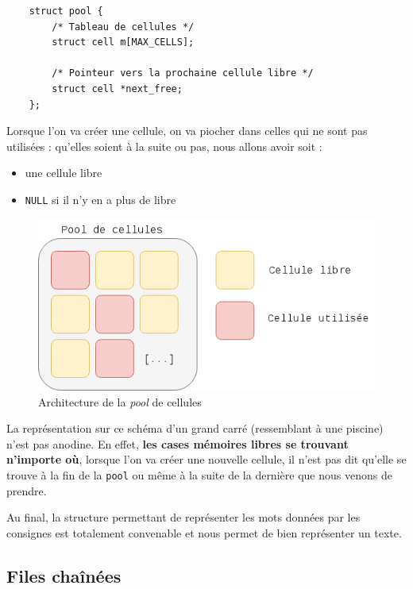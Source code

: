 \documentclass{article}
\newcommand{\inlinecode}[2]{\colorbox{white}{\lstinline[language=#1]$#2$}}
\begin{document}
\begin{lstlisting}
    struct pool {
        /* Tableau de cellules */
        struct cell m[MAX_CELLS];
        
        /* Pointeur vers la prochaine cellule libre */
        struct cell *next_free;
    };
\end{lstlisting}
\label{lst:struct_pool}

Lorsque l'on va créer une cellule, on va piocher dans celles qui ne sont pas utilisées : qu'elles soient à la suite ou pas, nous allons avoir soit :
\begin{itemize}
    \item une cellule libre
    \item \inlinecode{C}{NULL} si il n'y en a plus de libre
\end{itemize}

\begin{figure}[ht!]
\centering
\includegraphics[scale=0.4]{pool.png}
\caption{Architecture de la \textit{pool} de cellules}
\label{fig:pool}
\end{figure}

La représentation sur ce schéma d'un grand carré (ressemblant à une piscine) n'est pas anodine. En effet, \textbf{les cases mémoires libres se trouvant n'importe où}, lorsque l'on va créer une nouvelle cellule, il n'est pas dit qu'elle se trouve à la fin de la \inlinecode{C}{pool} ou même à la suite de la dernière que nous venons de prendre.

Au final, la structure permettant de représenter les mots données par les consignes est totalement convenable et nous permet de bien représenter un texte.


\subsection{Files chaînées}
\label{subsct:file_chainee}
\end{document}
